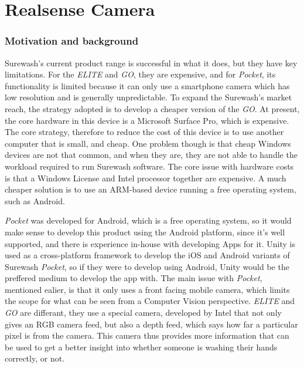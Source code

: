 \part{Realsense Camera}
\section{Motivation and background}
Surewash's current product range is successful in what it does, but they have key limitations. For the {\slshape ELITE} and {\slshape GO}, they are expensive, and for {\slshape Pocket}, its functionality is limited because it can only use a smartphone camera which has low resolution and is generally unpredictable. To expand the Surewash's market reach, the strategy adopted is to develop a cheaper version of the {\slshape GO}. At present, the core hardware in this device is a Microsoft Surface Pro, which is expensive. The core strategy, therefore to reduce the cost of this device is to use another computer that is small, and cheap. One problem though is that cheap Windows devices are not that common, and when they are, they are not able to handle the workload required to run Surewash software. The core issue with hardware costs is that a Windows License and Intel processor together are expensive. A much cheaper solution is to use an ARM-based device running a free operating system, such as Android.

{\slshape Pocket} was developed for Android, which is a free operating system, so it would make sense to develop this product using the Android platform, since it's well supported, and there is experience in-house with developing Apps for it. Unity is used as a cross-platform framework to develop the iOS and Android variants of Surewash {\slshape Pocket}, so if they were to develop using Android, Unity would be the preffered medium to develop the app with. The main issue with {\slshape Pocket}, mentioned ealier, is that it only uses a front facing mobile camera, which limits the scope for what can be seen from a Computer Vision perspective. {\slshape ELITE} and {\slshape GO} are differant, they use a special camera, developed by Intel that not only gives an RGB camera feed, but also a depth feed, which says how far a particular pixel is from the camera. This camera thus provides more information that can be used to get a better insight into whether someone is washing their hands correctly, or not.

